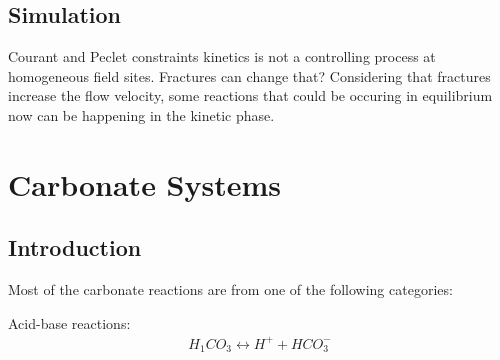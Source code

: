 \documentclass[11pt,twoside]{report}
\begin{document}
% 
% 


\section{Simulation}
Courant and Peclet constraints
kinetics is not a controlling process at homogeneous field sites. Fractures can change that? Considering that fractures increase the flow velocity, some reactions that could be occuring in equilibrium now can be happening in the kinetic phase.



\chapter{Carbonate Systems}
\section{Introduction}
Most of the carbonate reactions are from one of the following categories:

Acid-base reactions:
\begin{align}
   H_{1}CO_{3} \longleftrightarrow H^{+} + HCO_{3}^{-}
\end{align}
\end{document}
